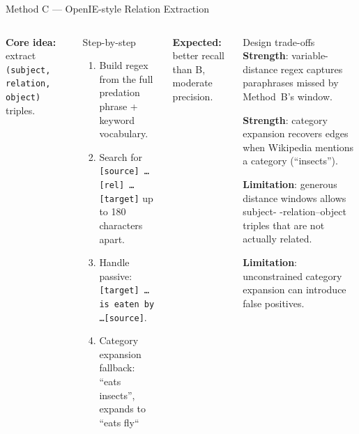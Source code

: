 \documentclass[aspectratio=169,11pt]{beamer}
\newcommand{\good}{\textcolor{td3green}{\textbf{Strength}}}
\newcommand{\bad}{\textcolor{td3red}{\textbf{Limitation}}}
\begin{document}
\begin{frame}{Method C --- OpenIE-style Relation Extraction}
  \begin{columns}[T,totalwidth=\textwidth]
      \small
      \textbf{Core idea:} extract \texttt{(subject, relation, object)} triples.

      \vspace{0.025em}
      \begin{block}{Step-by-step}
        \begin{enumerate}
          \item Build regex from the full predation phrase + keyword vocabulary.
          \item Search for \texttt{[source] \ldots [rel] \ldots [target]} up to 180 characters apart.
          \item Handle passive: \texttt{[target] \ldots is eaten by \ldots [source]}.
          \item \alert{Category expansion fallback}: ``eats insects'', expands to ``eats fly``
        \end{enumerate}
      \end{block}
      \vspace{0.5em}
      \textbf{Expected:} better recall than B, moderate precision.
      
    \small
      \begin{block}{Design trade-offs}
      \good: variable-distance regex captures paraphrases missed by Method~B's window.

      \vspace{0.2em}
      \good: category expansion recovers edges when Wikipedia mentions a category (``insects'').

      \vspace{0.2em}
      \bad: generous distance windows allows subject- -relation--object triples that are not actually related.

      \vspace{0.2em}
      \bad: unconstrained category expansion can introduce false positives.

      \end{block}
  \end{columns}
\end{frame}
\end{document}
